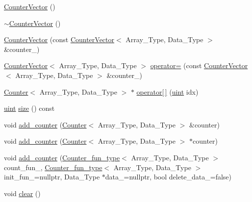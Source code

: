 \begin{DoxyCompactItemize}
\item 
\hyperlink{classbarry_1_1_counter_vector_a620e7a96ebfd05fe71da6476f27c2850}{Counter\+Vector} ()
\item 
\hyperlink{classbarry_1_1_counter_vector_a6a6cfc7b9a3ff220311d312786a8e3eb}{$\sim$\+Counter\+Vector} ()
\item 
\hyperlink{classbarry_1_1_counter_vector_aaa2e5f597feaf8569ca098be1c9069e0}{Counter\+Vector} (const \hyperlink{classbarry_1_1_counter_vector}{Counter\+Vector}$<$ Array\+\_\+\+Type, Data\+\_\+\+Type $>$ \&counter\+\_\+)
\item 
\hyperlink{classbarry_1_1_counter_vector}{Counter\+Vector}$<$ Array\+\_\+\+Type, Data\+\_\+\+Type $>$ \hyperlink{classbarry_1_1_counter_vector_a2bfd2bd8e1d5a723cbc3a5538988a944}{operator=} (const \hyperlink{classbarry_1_1_counter_vector}{Counter\+Vector}$<$ Array\+\_\+\+Type, Data\+\_\+\+Type $>$ \&counter\+\_\+)
\item 
\hyperlink{classbarry_1_1_counter}{Counter}$<$ Array\+\_\+\+Type, Data\+\_\+\+Type $>$ $\ast$ \hyperlink{classbarry_1_1_counter_vector_a6eac3e73298e1e6d424b92f324ffe9a8}{operator\mbox{[}$\,$\mbox{]}} (\hyperlink{namespacebarry_a11dfc53ddb4672278319aa04f1e09a6c}{uint} idx)
\item 
\hyperlink{namespacebarry_a11dfc53ddb4672278319aa04f1e09a6c}{uint} \hyperlink{classbarry_1_1_counter_vector_a05508f97e15d5a6dd2fdefb2d03060de}{size} () const
\item 
void \hyperlink{classbarry_1_1_counter_vector_a34fda06ff678691daf3b0455c1a2af48}{add\+\_\+counter} (\hyperlink{classbarry_1_1_counter}{Counter}$<$ Array\+\_\+\+Type, Data\+\_\+\+Type $>$ \&counter)
\item 
void \hyperlink{classbarry_1_1_counter_vector_a062d52e18f1d3ba4c00cbf4c2d89f1e7}{add\+\_\+counter} (\hyperlink{classbarry_1_1_counter}{Counter}$<$ Array\+\_\+\+Type, Data\+\_\+\+Type $>$ $\ast$counter)
\item 
void \hyperlink{classbarry_1_1_counter_vector_adb32ff1af45bc05a292a5cb064dc414d}{add\+\_\+counter} (\hyperlink{namespacebarry_abaaae3200da8e4b7faac3c04fe9c3081}{Counter\+\_\+fun\+\_\+type}$<$ Array\+\_\+\+Type, Data\+\_\+\+Type $>$ count\+\_\+fun\+\_\+, \hyperlink{namespacebarry_abaaae3200da8e4b7faac3c04fe9c3081}{Counter\+\_\+fun\+\_\+type}$<$ Array\+\_\+\+Type, Data\+\_\+\+Type $>$ init\+\_\+fun\+\_\+=nullptr, Data\+\_\+\+Type $\ast$data\+\_\+=nullptr, bool delete\+\_\+data\+\_\+=false)
\item 
void \hyperlink{classbarry_1_1_counter_vector_acce75748f917e3a7898d49a23df996e7}{clear} ()
\end{DoxyCompactItemize}


